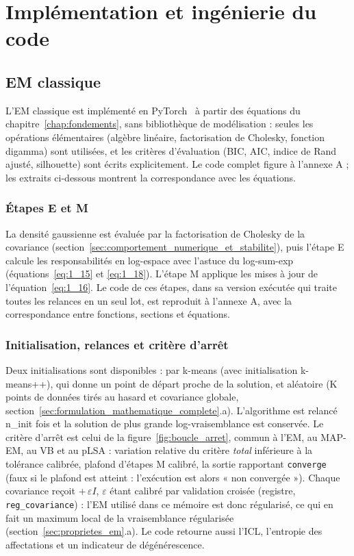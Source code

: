 \section{Implémentation et ingénierie du code}\label{sec:implementation}
\subsection{EM classique}\label{sec:impl_em}
L'EM classique est implémenté en PyTorch~\cite{paszke2019} à partir des équations du chapitre~\ref{chap:fondements}, sans bibliothèque de modélisation : seules les opérations élémentaires (algèbre linéaire, factorisation de Cholesky, fonction digamma) sont utilisées, et les critères d'évaluation (BIC, AIC, indice de Rand ajusté, silhouette) sont écrits explicitement. Le code complet figure à l'annexe A ; les extraits ci-dessous montrent la correspondance avec les équations.

\subsubsection*{Étapes E et M}
La densité gaussienne est évaluée par la factorisation de Cholesky de la covariance (section~\ref{sec:comportement_numerique_et_stabilite}), puis l'étape E calcule les responsabilités en log-espace avec l'astuce du log-sum-exp (équations~\ref{eq:1_15} et \ref{eq:1_18}). L'étape M applique les mises à jour de l'équation~\eqref{eq:1_16}. Le code de ces étapes, dans sa version exécutée qui traite toutes les relances en un seul lot, est reproduit à l'annexe A, avec la correspondance entre fonctions, sections et équations.

\subsubsection*{Initialisation, relances et critère d'arrêt}\label{sec:impl_em_init}
Deux initialisations sont disponibles : par k-means (avec initialisation k-means++), qui donne un point de départ proche de la solution, et aléatoire (K points de données tirés au hasard et covariance globale, section~\ref{sec:formulation_mathematique_complete}.a). L'algorithme est relancé n\_init fois et la solution de plus grande log-vraisemblance est conservée. Le critère d'arrêt est celui de la figure~\ref{fig:boucle_arret}, commun à l'EM, au MAP-EM, au VB et au pLSA : variation relative du critère \emph{total} inférieure à la tolérance calibrée, plafond d'étapes M calibré, la sortie rapportant \texttt{converge} (faux si le plafond est atteint : l'exécution est alors « non convergée »). Chaque covariance reçoit $+\,\varepsilon I$, $\varepsilon$ étant calibré par validation croisée (registre, \texttt{reg\_covariance}) : l'EM utilisé dans ce mémoire est donc régularisé, ce qui en fait un maximum local de la vraisemblance régularisée (section~\ref{sec:proprietes_em}.a). Le code retourne aussi l'ICL, l'entropie des affectations et un indicateur de dégénérescence.

